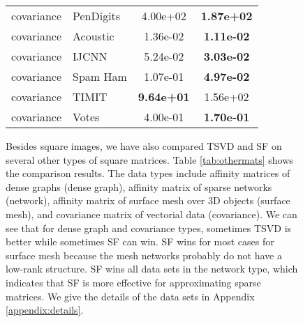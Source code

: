 \documentclass{article}
\begin{document}
\begin{figure}[t]
\begin{center}
\begin{table}[t]
\begin{center}
\begin{tabular}{llcc}
  covariance &        PenDigits &        4.00e+02 &   \bf{1.87e+02} \\
  covariance &         Acoustic &        1.36e-02 &   \bf{1.11e-02} \\
  covariance &            IJCNN &        5.24e-02 &   \bf{3.03e-02} \\
  covariance &         Spam Ham &        1.07e-01 &   \bf{4.97e-02} \\
  covariance &            TIMIT &   \bf{9.64e+01} &        1.56e+02 \\
  covariance &            Votes &        4.00e-01 &   \bf{1.70e-01} \\
\hline
\hline
\end{tabular}
\end{center}
\vspace{-3mm}
\end{table}

Besides square images, we have also compared TSVD and SF on several other types of square matrices. Table \ref{tab:othermats} shows the comparison results. The data types include affinity matrices of dense graphs (dense graph), affinity matrix of sparse networks (network), affinity matrix of surface mesh over 3D objects (surface mesh), and covariance matrix of vectorial data (covariance). We can see that for dense graph and covariance types, sometimes TSVD is better while sometimes SF can win. SF wins for most cases for surface mesh because the mesh networks probably do not have a low-rank structure. SF wins all data sets in the network type, which indicates that SF is more effective for approximating sparse matrices. We give the details of the data sets in Appendix \ref{appendix:details}.


\end{center}
\end{figure}
\end{document}
